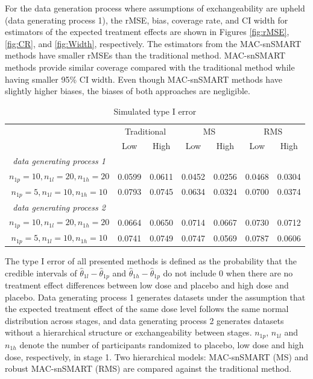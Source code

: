 For the data generation process where assumptions of exchangeability are upheld (data generating process 1), the \ac{rMSE}, bias, coverage rate, and \ac{CI} width for estimators of the expected treatment effects are shown in Figures \ref{fig:rMSE},  \ref{fig:CR}, and \ref{fig:Width}, respectively. The estimators from the \ac{MAC}-snSMART methods have smaller rMSEs than the traditional method. \ac{MAC}-snSMART methods provide similar coverage compared with the traditional method while having smaller 95\% \ac{CI} width. Even though \ac{MAC}-snSMART methods have slightly higher biases, the biases of both approaches are negligible. 
\begin{table} 
\begin{center}
\caption{\label{tab:TypeI} Simulated type I error}
\begin{tabular}{ccccccc}
\hline
\centering \multirow{2}{*}{Sample Size} & \multicolumn{2}{c}{Traditional} & \multicolumn{2}{c}{MS} & \multicolumn{2}{c}{RMS}\\
\centering  & Low & High & Low & High & Low & High \\
\hline
\textit{data generating process 1} &&&&&& \\
\raggedleft $n_{1p} = 10, n_{1l} = 20, n_{1h} = 20$ & 0.0599 & 0.0611  & 0.0452 & 0.0256 & 0.0468 & 0.0304 \\
\raggedleft $n_{1p} = 5, n_{1l} = 10, n_{1h} = 10$ & 0.0793 & 0.0745 & 0.0634 & 0.0324 & 0.0700 & 0.0374 \\
\textit{data generating process 2} &&&&&& \\
\raggedleft $n_{1p} = 10, n_{1l} = 20, n_{1h} = 20$ & 0.0664 & 0.0650 & 0.0714 & 0.0667 & 0.0730 & 0.0712 \\
\raggedleft $n_{1p} = 5, n_{1l} = 10, n_{1h} = 10$ & 0.0741 & 0.0749 & 0.0747 & 0.0569 & 0.0787 & 0.0606\\
\hline
\end{tabular}
\end{center}
\begin{tablenotes}
      \small
      \item The type I error of all presented methods is defined as the probability that the credible intervals of $\hat{\theta}_{1l} - \hat{\theta}_{1p}$ and $\hat{\theta}_{1h} - \hat{\theta}_{1p}$ do not include 0 when there are no treatment effect differences between low dose and placebo and high dose and placebo. Data generating process 1 generates datasets under the assumption that the expected treatment effect of the same dose level follows the same normal distribution across stages, and data generating process 2 generates datasets without a hierarchical structure or exchangeability between stages. $n_{1p}$, $n_{1l}$ and $n_{1h}$ denote the number of participants randomized to placebo, low dose and high dose, respectively, in stage 1. Two hierarchical models: MAC-snSMART (MS) and robust MAC-snSMART (RMS) are compared against the traditional method. 
\end{tablenotes}
\end{table}

